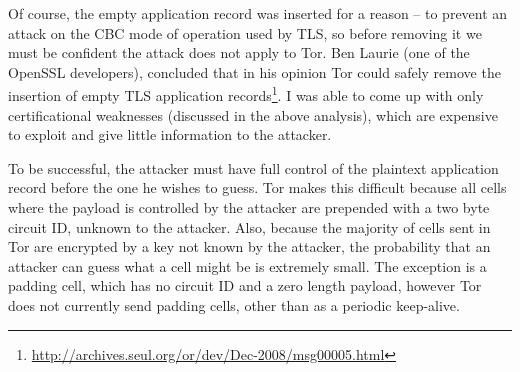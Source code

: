 \documentclass{article}
\begin{document}
Of course, the empty application record was inserted for a reason -- to prevent an attack on the CBC mode of operation used by TLS, so before removing it we must be confident the attack does not apply to Tor.
Ben Laurie (one of the OpenSSL developers), concluded that in his opinion Tor could safely remove the insertion of empty TLS application records\footnote{\url{http://archives.seul.org/or/dev/Dec-2008/msg00005.html}}.
I was able to come up with only certificational weaknesses (discussed in the above analysis), which are expensive to exploit and give little information to the attacker.

To be successful, the attacker must have full control of the plaintext application record before the one he wishes to guess.
Tor makes this difficult because all cells where the payload is controlled by the attacker are prepended with a two byte circuit ID, unknown to the attacker.
Also, because the majority of cells sent in Tor are encrypted by a key not known by the attacker, the probability that an attacker can guess what a cell might be is extremely small.
The exception is a padding cell, which has no circuit ID and a zero length payload, however Tor does not currently send padding cells, other than as a periodic keep-alive.
\end{document}
